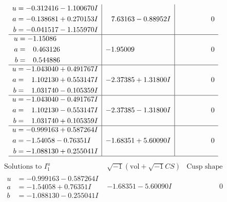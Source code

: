 \documentclass[1p]{elsarticle_modified}
\theoremstyle{definition}
\newcommand{\I}{\sqrt{-1}}
\begin{document}
$$\begin{array}{c|c|c}
\begin{aligned}
u &= -0.312416 - 1.100670 I \\
a &= -0.138681 + 0.270153 I \\
b &= -0.041517 - 1.155970 I\end{aligned}
 & \phantom{-}7.63163 - 0.88952 I & \phantom{-0.000000 } 0 \\ \hline\begin{aligned}
u &= -1.15086\phantom{ +0.000000I} \\
a &= \phantom{-}0.463126\phantom{ +0.000000I} \\
b &= \phantom{-}0.544886\phantom{ +0.000000I}\end{aligned}
 & -1.95009\phantom{ +0.000000I} & \phantom{-0.000000 } 0 \\ \hline\begin{aligned}
u &= -1.043040 + 0.491767 I \\
a &= \phantom{-}1.102130 + 0.553147 I \\
b &= \phantom{-}1.031740 - 0.105359 I\end{aligned}
 & -2.37385 + 1.31800 I & \phantom{-0.000000 } 0 \\ \hline\begin{aligned}
u &= -1.043040 - 0.491767 I \\
a &= \phantom{-}1.102130 - 0.553147 I \\
b &= \phantom{-}1.031740 + 0.105359 I\end{aligned}
 & -2.37385 - 1.31800 I & \phantom{-0.000000 } 0 \\ \hline\begin{aligned}
u &= -0.999163 + 0.587264 I \\
a &= -1.54058 - 0.76351 I \\
b &= -1.088130 + 0.255041 I\end{aligned}
 & -1.68351 + 5.60090 I & \phantom{-0.000000 } 0\\
 \hline 
 \end{array}$$\newpage$$\begin{array}{c|c|c}  
\text{Solutions to }I^u_{1}& \I (\text{vol} + \sqrt{-1}CS) & \text{Cusp shape}\\
 \hline 
\begin{aligned}
u &= -0.999163 - 0.587264 I \\
a &= -1.54058 + 0.76351 I \\
b &= -1.088130 - 0.255041 I\end{aligned}
 & -1.68351 - 5.60090 I & \phantom{-0.000000 } 0 \\ \hline\begin{aligned}

\end{aligned}
\end{array}$$
\end{document}
